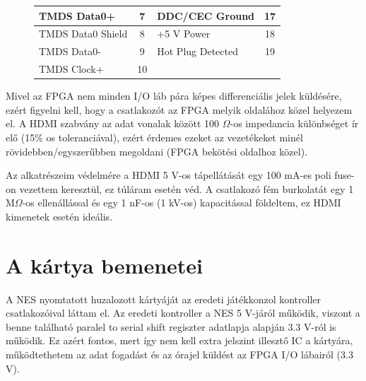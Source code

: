 \begin{figure}[H]
\begin{minipage}[]{\textwidth}
\begin{minipage}[b]{0.59\textwidth}
\begin{tabular}{|l|c|l|c|}
				TMDS Data0+       & 7                                                                                & DDC/CEC Ground    & 17                                                                               \\ \hline
				TMDS Data0 Shield & 8                                                                                & +5 V Power        & 18                                                                               \\ \hline
				TMDS Data0-       & 9                                                                                & Hot Plug Detected & 19                                                                               \\ \hline
				TMDS Clock+       & 10                                                                               &                   & \multicolumn{1}{l|}{}                                                            \\ \hline
			\end{tabular}
			\label{tab:HDMI-pinout}
		\end{minipage}
	\end{minipage}
	\end{figure} 
	
	Mivel az FPGA nem minden I/O láb pára képes differenciális jelek küldésére, ezért figyelni kell, hogy a csatlakozót az FPGA melyik oldalához közel helyezem el. A HDMI szabvány az adat vonalak között 100 $\Omega$-os impedancia különbséget ír elő (15\% os toleranciával), ezért érdemes ezeket az vezetékeket minél rövidebben/egyszerűbben megoldani (FPGA bekötési oldalhoz közel). 
	
	Az alkatrészeim védelmére a HDMI 5 V-os tápellátását egy 100 mA-es poli fuse-on vezettem keresztül, ez túláram esetén véd. A csatlakozó fém burkolatát egy 1 M$\Omega$-os ellenállással és egy 1 nF-os (1 kV-os) kapacitással földeltem, ez HDMI kimenetek esetén ideális. 
	
\section{A kártya bemenetei}
	
	A NES nyomtatott huzalozott kártyáját az eredeti játékkonzol kontroller csatlakozóival láttam el. Az eredeti kontroller a NES 5 V-járól működik, viszont a benne található paralel to serial shift regiszter adatlapja alapján 3.3 V-ról is működik. Ez azért fontos, mert így nem kell extra jelszint illesztő IC a kártyára, működtethetem az adat fogadást és az órajel küldést az FPGA I/O lábairól (3.3 V).
	
